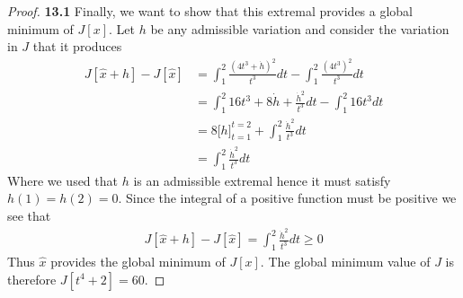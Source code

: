 \documentclass[11pt]{article}
\theoremstyle{definition}
\begin{document}
\begin{proof}{\textbf{13.1}}
    Finally, we want to show that this extremal provides
    a global minimum of $J[x]$. Let $h$ be any admissible variation and 
    consider the variation in $J$ that it produces
    \begin{align*}
        J[\hat x + h] - J[\hat x]
        &= \int_1^2 \frac{(4t^3 + \dot h)^2}{t^3} dt
        - \int_1^2 \frac{(4t^3)^2}{t^3} dt\\
        &= \int_1^2 16t^3 + 8\dot h + \frac{\dot h^2}{t^3} dt
        - \int_1^2 16t^3 dt\\
        &= 8 \bigg[h\bigg]_{t=1}^{t=2} + \int_1^2 \frac{\dot h^2}{t^3} dt\\
        &= \int_1^2 \frac{\dot h^2}{t^3} dt
    \end{align*}
    Where we used that $h$ is an admissible extremal hence it must satisfy
    $h(1) = h(2) = 0$. Since the integral of a positive function must be
    positive we see that
    \begin{align*}
        J[\hat x + h] - J[\hat x] = \int_1^2 \frac{\dot h^2}{t^3} dt \geq 0
    \end{align*}
    Thus $\hat x$ provides the global minimum of $J[x]$.
    The global minimum value of $J$ is therefore $J [t^4 + 2] = 60$. 

\end{proof}
\cleardoublepage
\end{document}
